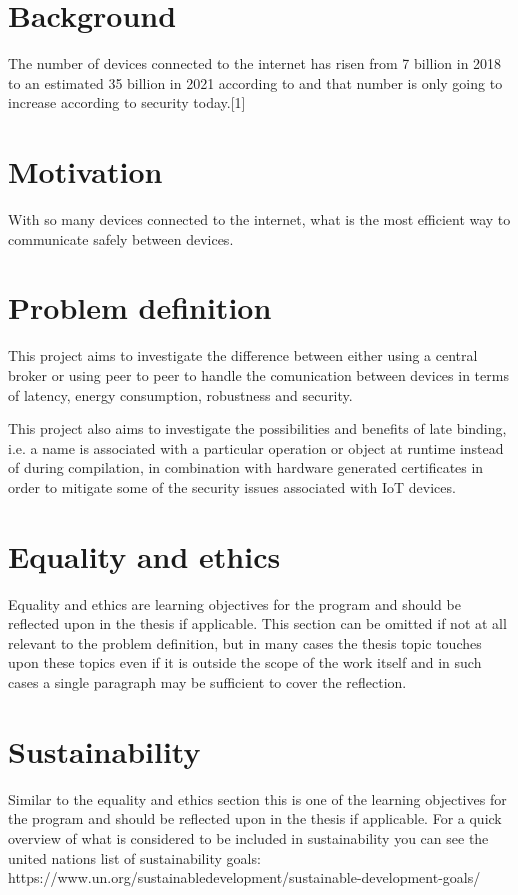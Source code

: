\section{Background}
The number of devices connected to the internet has risen from 7 billion in 2018 to an estimated 35 billion in 2021 according to and that number is only going to increase
according to security today.[1] %
\section{Motivation}
With so many devices connected to the internet, what is the most efficient way to 
communicate safely between devices. 
\section{Problem definition}
This project aims to investigate the difference between either 
using a central broker or using peer to peer to handle the comunication 
between devices in terms of latency, energy consumption, robustness and
security. 

This project also aims to investigate the possibilities and benefits of 
late binding, i.e. a name is associated
with a particular operation or object at runtime instead of during 
compilation, in combination with hardware generated certificates  
in order to mitigate some of the security  issues associated with 
IoT devices.
\section{Equality and ethics}
Equality and ethics are learning objectives for the program and should be reflected upon in the thesis if applicable. This section can be omitted if not at all relevant to the problem definition, but in many cases the thesis topic touches upon these topics even if it is outside the scope of the work itself and in such cases a single paragraph may be sufficient to cover the reflection.
\section{Sustainability}
Similar to the equality and ethics section this is one of the learning objectives for the program and should be reflected upon in the thesis if applicable. For a quick overview of what is considered to be included in sustainability you can see the united nations list of sustainability goals: https://www.un.org/sustainabledevelopment/sustainable-development-goals/
